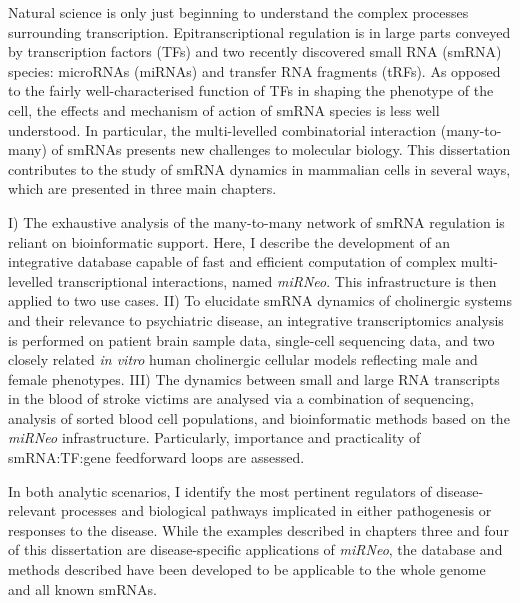 
Natural science is only just beginning to understand the complex processes surrounding transcription. Epitranscriptional regulation is in large parts conveyed by transcription factors (TFs) and two recently discovered small RNA (smRNA) species: microRNAs (miRNAs) and transfer RNA fragments (tRFs). As opposed to the fairly well-characterised function of TFs in shaping the phenotype of the cell, the effects and mechanism of action of smRNA species is less well understood. In particular, the multi-levelled combinatorial interaction (many-to-many) of smRNAs presents new challenges to molecular biology. This dissertation contributes to the study of smRNA dynamics in mammalian cells in several ways, which are presented in three main chapters.

I) The exhaustive analysis of the many-to-many network of smRNA regulation is reliant on bioinformatic support. Here, I describe the development of an integrative database capable of fast and efficient computation of complex multi-levelled transcriptional interactions, named \emph{miRNeo}. This infrastructure is then applied to two use cases. II) To elucidate smRNA dynamics of cholinergic systems and their relevance to psychiatric disease, an integrative transcriptomics analysis is performed on patient brain sample data, single-cell sequencing data, and two closely related \emph{in vitro} human cholinergic cellular models reflecting male and female phenotypes. III) The dynamics between small and large RNA transcripts in the blood of stroke victims are analysed via a combination of sequencing, analysis of sorted blood cell populations, and bioinformatic methods based on the \emph{miRNeo} infrastructure. Particularly, importance and practicality of smRNA:TF:gene feedforward loops are assessed. 

In both analytic scenarios, I identify the most pertinent regulators of disease-relevant processes and biological pathways implicated in either pathogenesis or responses to the disease. While the examples described in chapters three and four of this dissertation are disease-specific applications of \emph{miRNeo}, the database and methods described have been developed to be applicable to the whole genome and all known smRNAs.

